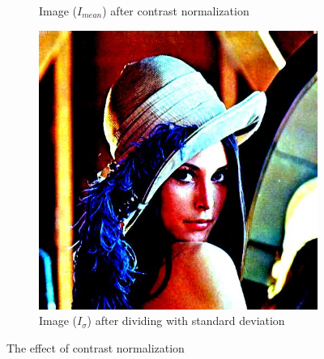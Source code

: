 \documentclass{article} %
\begin{document}
\begin{figure}
\begin{subfigure}{0.33\textwidth}
\caption{Image ($I_{mean}$)  after contrast normalization}
\end{subfigure}
\begin{subfigure}{0.33\textwidth}
\centering
\includegraphics[scale=0.2]{images/lena_std}
\caption{Image ($I_{\sigma}$) after dividing with standard deviation}
\end{subfigure}
\caption{The effect of contrast normalization }
\label{fig:contrast}
\end{figure}
\end{document}
